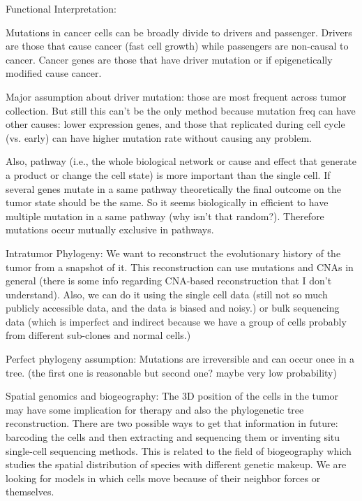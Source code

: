 	Functional Interpretation:
	
	Mutations in cancer cells can be broadly divide to drivers and passenger. 
	Drivers are those that cause cancer (fast cell growth) while passengers are non-causal to cancer. 
	Cancer genes are those that have driver mutation or if epigenetically modified cause cancer. 
	
	Major assumption about driver mutation: those are most frequent across tumor collection. 
	But still this can't be the only method because mutation freq can have other causes:
	lower expression genes, and those that replicated during cell cycle (vs. early) can have higher mutation rate without causing any problem. 
	
	Also, pathway (i.e., the whole biological network or cause and effect that generate a product or change the cell state) is more important than the single cell. 
	If several genes mutate in a same pathway theoretically the final outcome on the tumor state should be the same. 
	So it seems biologically in efficient to have multiple mutation in a same pathway (why isn't that random?). 
	Therefore mutations occur mutually exclusive in pathways. 
	
	Intratumor Phylogeny:
	We want to reconstruct the evolutionary history of the tumor from a snapshot of it. 
	This reconstruction can use mutations and CNAs in general (there is some info regarding CNA-based reconstruction that I don't understand). 
	Also, we can do it using the single cell data (still not so much publicly accessible data, and the data is biased and noisy.) or bulk sequencing data (which is imperfect and indirect because we have a group of cells probably from different sub-clones and normal cells.)
	
	Perfect phylogeny assumption:
	Mutations are irreversible and can occur once in a tree. (the first one is reasonable but second one? maybe very low probability)
	
	Spatial genomics and biogeography:
	The 3D position of the cells in the tumor may have some implication for therapy and also the phylogenetic tree reconstruction. 
	There are two possible ways to get that information in future: barcoding the cells and then extracting and sequencing them or inventing situ single-cell sequencing methods. 
	This is related to the field of biogeography which studies the spatial distribution of species with different genetic makeup. 
	We are looking for models in which cells move because of their neighbor forces or themselves. 
	
